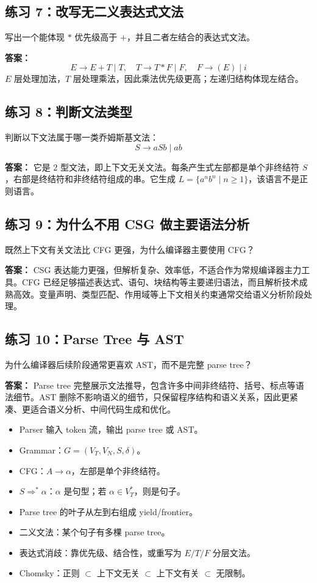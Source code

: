 \documentclass[UTF8,fontset=none,11pt]{ctexart}
\newenvironment{notebox}[1][]{%
  \par\medskip\noindent{\color{maincol}\rule{\linewidth}{1.1pt}}\par\nopagebreak
  \noindent{\bfseries\color{maincol}#1}\par\nopagebreak\smallskip}%
  {\par\nopagebreak\smallskip\noindent{\color{maincol}\rule{\linewidth}{0.4pt}}\par\medskip}
\begin{document}
\subsection*{练习 7：改写无二义表达式文法}
写出一个能体现 \(*\) 优先级高于 \(+\)，并且二者左结合的表达式文法。

\textbf{答案：}
\[
E\to E+T\mid T,\quad T\to T*F\mid F,\quad F\to(E)\mid i
\]
\(E\) 层处理加法，\(T\) 层处理乘法，因此乘法优先级更高；左递归结构体现左结合。

\subsection*{练习 8：判断文法类型}
判断以下文法属于哪一类乔姆斯基文法：
\[
S\to aSb\mid ab
\]

\textbf{答案：}
它是 2 型文法，即上下文无关文法。每条产生式左部都是单个非终结符 \(S\)，右部是终结符和非终结符组成的串。它生成 \(L=\{a^n b^n\mid n\ge1\}\)，该语言不是正则语言。

\subsection*{练习 9：为什么不用 CSG 做主要语法分析}
既然上下文有关文法比 CFG 更强，为什么编译器主要使用 CFG？

\textbf{答案：}
CSG 表达能力更强，但解析复杂、效率低，不适合作为常规编译器主力工具。CFG 已经足够描述表达式、语句、块结构等主要递归语法，而且解析技术成熟高效。变量声明、类型匹配、作用域等上下文相关约束通常交给语义分析阶段处理。

\subsection*{练习 10：Parse Tree 与 AST}
为什么编译器后续阶段通常更喜欢 AST，而不是完整 parse tree？

\textbf{答案：}
Parse tree 完整展示文法推导，包含许多中间非终结符、括号、标点等语法细节。AST 删除不影响语义的细节，只保留程序结构和语义关系，因此更紧凑、更适合语义分析、中间代码生成和优化。

\begin{notebox}[考前速记]
\begin{itemize}
  \item Parser 输入 token 流，输出 parse tree 或 AST。
  \item Grammar：\(G=(V_T,V_N,S,\delta)\)。
  \item CFG：\(A\to\alpha\)，左部是单个非终结符。
  \item \(S\Rightarrow^*\alpha\)：\(\alpha\) 是句型；若 \(\alpha\in V_T^*\)，则是句子。
  \item Parse tree 的叶子从左到右组成 yield/frontier。
  \item 二义文法：某个句子有多棵 parse tree。
  \item 表达式消歧：靠优先级、结合性，或重写为 \(E/T/F\) 分层文法。
  \item Chomsky：正则 \(\subset\) 上下文无关 \(\subset\) 上下文有关 \(\subset\) 无限制。
\end{itemize}
\end{notebox}
\end{document}

